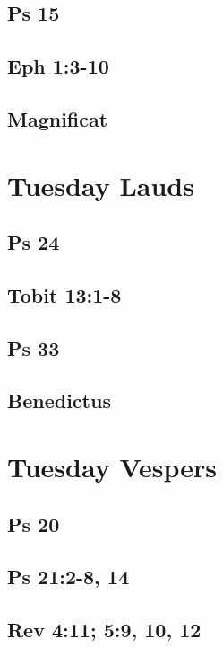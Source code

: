 \subsection{Ps 15}

\subsection{Eph 1:3-10}

\subsection{Magnificat}


\section{Tuesday Lauds}

\subsection{Ps 24}

\subsection{Tobit 13:1-8}

\subsection{Ps 33}

\subsection{Benedictus}


\section{Tuesday Vespers}

\subsection{Ps 20}

\subsection{Ps 21:2-8, 14}

\subsection{Rev 4:11; 5:9, 10, 12}

